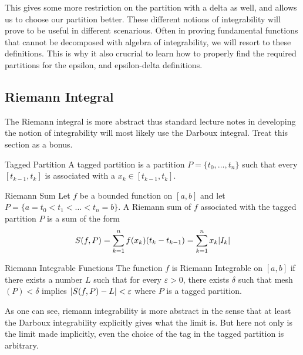 \documentclass[a4paper]{article}
\begin{document}
This gives some more restriction on the partition with a delta as well, and allows us to choose our partition better. These different notions of integrability will prove to be useful in different scenarious. Often in proving fundamental functions that cannot be decomposed with algebra of integrability, we will resort to these definitions. This is why it also crucrial to learn how to properly find the required partitions for the epsilon, and epsilon-delta definitions. 

\subsection{Riemann Integral}
The Riemann integral is more abstract thus standard lecture notes in developing the notion of integrability will most likely use the Darboux integral. Treat this section as a bonus. 

\begin{defn}{Tagged Partition}{} A tagged partition is a partition $P=\{t_0,\dots,t_n\}$ such that every $[t_{k-1},t_k]$ is associated with a $x_k\in[t_{k-1},t_k]$. 
\end{defn}

\begin{defn}{Riemann Sum}{} Let $f$ be a bounded function on $[a,b]$ and let $P=\{a=t_0<t_1<\dots<t_n=b\}$. A Riemann sum of $f$ associated with the tagged partition $P$ is a sum of the form $$S(f,P)=\sum_{k=1}^{n}f(x_k)(t_k-t_{k-1})=\sum_{k=1}^nx_k\abs{I_k}$$
\end{defn}

\begin{defn}{Riemann Integrable Functions}{} The function $f$ is Riemann Integrable on $[a,b]$ if there exists a number $L$ such that for every $\varepsilon>0$, there exists $\delta$ such that mesh$(P)<\delta$ implies $\abs{S(f,P)-L}<\varepsilon$ where $P$ is a tagged partition. 
\end{defn}

As one can see, riemann integrability is more abstract in the sense that at least the Darboux integrability explicitly gives what the limit is. But here not only is the limit made implicitly, even the choice of the tag in the tagged partition is arbitrary. 
\end{document}

